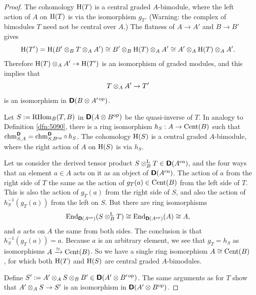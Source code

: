 \begin{proof}
The cohomology $\operatorname{H}(T)$ is a central graded $A$-bimodule, where the 
left action of $A$ on $\operatorname{H}(T)$ is via the isomorphism  $g_T$. (Warning: the 
complex of 
bimodules $T$ need not be central over $A$.) The flatness of $A \to A'$ and 
$B \to B'$ gives 
\[ \operatorname{H}(T') = \operatorname{H}(B' \otimes_B T \otimes_A A') \cong 
B' \otimes_B \operatorname{H}(T) \otimes_A A' \cong A' \otimes_A \operatorname{H}(T) \otimes_A A' . \]
Therefore 
$\operatorname{H}(T) \otimes_A A' \to \operatorname{H}(T')$ 
is an isomorphism of graded modules, and this implies that 
\begin{equation} \label{eqn:3585}
T \otimes_A A' \to T'
\end{equation}
is an isomorphism in 
$\boldsymbol{\mathsf{D}}(B \otimes A'^{\, \mathrm{op}})$. 

Let 
$S := \operatorname{RHom}_B(T, B)$ in $\boldsymbol{\mathsf{D}}(A \otimes B^{\mathrm{op}})$
be the quasi-inverse of $T$. 
In analogy to Definition \ref{dfn:5090}, there is a ring isomorphism 
$h_S : A \to \operatorname{Cent}(B)$
such that 
$\operatorname{chm}^{\boldsymbol{\mathsf{D}}}_{S, A}  = 
\operatorname{chm}^{\boldsymbol{\mathsf{D}}}_{S, B^{\mathrm{op}}} \circ \, h_S$.
The cohomology $\operatorname{H}(S)$ is a central graded $A$-bimodule, 
where the right action of $A$ on $\operatorname{H}(S)$ is via $h_S$.

Let us consider the derived tensor product 
$S \otimes^{\mathrm{L}}_{B} T \in \boldsymbol{\mathsf{D}}(A^{\mathrm{en}})$,
and the four ways that an element $a \in A$ acts on it as an 
object of $\boldsymbol{\mathsf{D}}(A^{\mathrm{en}})$. 
The action of $a$ from the right side of $T$ the same as the action of 
$g_T(a) \in \operatorname{Cent}(B)$ from the left side of $T$. This is also the action 
of $g_T(a)$ from the right side of $S$, and also the action of 
$h_S^{-1}(g_T(a))$ from the left on $S$. 
But there are ring isomorphisms 
\[ \operatorname{End}_{\boldsymbol{\mathsf{D}}(A^{\mathrm{en}})}(S \otimes^{\mathrm{L}}_{B} T) \cong 
\operatorname{End}_{\boldsymbol{\mathsf{D}}(A^{\mathrm{en}})}(A) \cong A , \]
and $a$ acts on $A$ the same from both sides. The conclusion is that 
$h_S^{-1}(g_T(a)) = a$. 
Because $a$ is an arbitrary element, we see that $g_T = h_S$ as isomorphisms 
$A \xrightarrow{\simeq} \operatorname{Cent}(B)$. So we have a single ring isomorphism 
$A \cong \operatorname{Cent}(B)$, for which both $\operatorname{H}(T)$ and $\operatorname{H}(S)$ are 
central graded $A$-bimodules. 

Define 
$S' := A' \otimes_A S \otimes_B B' \in \boldsymbol{\mathsf{D}}(A' \otimes B'^{\, \mathrm{op}})$. 
The same arguments as for $T$ show that 
$A' \otimes_A S \to S'$ is an isomorphism in 
$\boldsymbol{\mathsf{D}}(A' \otimes B^{\mathrm{op}})$.


\end{proof}
